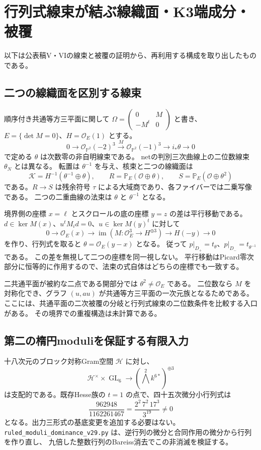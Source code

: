\section{行列式線束が結ぶ線織面・K3端成分・被覆}
\label{sec:notes-new-structures-v29}
以下は公表稿V・VIの線束と被覆の証明から、再利用する構成を取り出したものである\cite{PaperV,PaperVI}。

\subsection{二つの線織面を区別する線束}
順序付き共通等方三平面に関して
$\Omega=\left(\begin{smallmatrix}0&M\\-M^t&0\end{smallmatrix}\right)$ と書き、
$E=\{\det M=0\}$、$H=\mathcal O_E(1)$ とする。
\[
 0\to\mathcal O_{\mathbb P^2}(-2)^3\xrightarrow{M}
 \mathcal O_{\mathbb P^2}(-1)^3\to i_*\theta\to0
\]
で定める $\theta$ は次数零の非自明線束である。
netの判別三次曲線上の二位数線束 $\theta_N$ とは異なる。
転置は $\theta^{-1}$ を与え、核束と二つの線織面は
\[
 \mathcal K=H^{-1}(\theta^{-1}\oplus\theta),\qquad
 R=\mathbb P_E(\mathcal O\oplus\theta),\qquad
 S=\mathbb P_E(\mathcal O\oplus\theta^2)
\]
である。$R\to S$ は残余符号 $\tau$ による大域商であり、各ファイバーでは二乗写像である。
二つの二重曲線の法束は $\theta$ と $\theta^{-1}$ となる。

境界側の座標 $x=\ell$ とスクロールの底の座標 $y=z$ の差は平行移動である。
$d\in\ker M(x)$、$u^tM_i d=0$、$u\in\ker M(y)^t$ に対して
\[
 0\to\mathcal O_E(x)\to\operatorname{im}(M:\mathcal O_E^3\to H^{\oplus3})
 \to H(-y)\to0
\]
を作り、行列式を取ると $\theta=\mathcal O_E(y-x)$ となる。
従って $p|_{D_+}=t_\theta$、$p|_{D_-}=t_{\theta^{-1}}$ である。
この差を無視して二つの座標を同一視しない。
平行移動はPicard零次部分に恒等的に作用するので、法束の式自体はどちらの座標でも一致する。

二共通平面が被約な二点である開部分では $\theta^2\ne\mathcal O_E$ である。
二位数なら $M$ を対称化でき、グラフ $(u,au)$ が共通等方三平面の一次元族となるためである。
ここには、共通平面の二次被覆の分岐と行列式線束の二位数条件を比較する入口がある。
その境界での重複構造は未計算である。

\subsection{第二の楕円moduliを保証する有限入力}
十八次元のブロック対称Gram空間 $\mathcal H$ に対し、
\[
 \mathcal H^\times\times\operatorname{GL}_6
 \longrightarrow(\bigwedge^2 k^{6*})^{\oplus3}
\]
は支配的である。既存Hesse族の $t=1$ の点で、四十五次微分小行列式は
\[
 \frac{962948}{1162261467}
 =\frac{2^2\,7^2\,17^3}{3^{19}}\ne0
\]
となる。出力三形式の基底変更を追加する必要はない。
\nolinkurl{ruled_moduli_dominance_v29.py} は、逆行列の微分と合同作用の微分から行列を作り直し、
九倍した整数行列のBareiss消去でこの非消滅を検証する。

